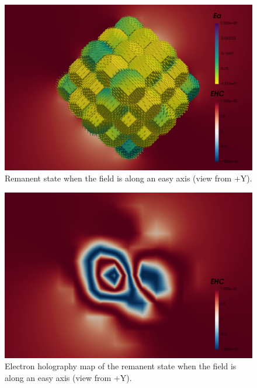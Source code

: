 \begin{figure}
\centering
\includegraphics[width=\textwidth]{research-4/figs/fram_i21_f0_-y.png}
\caption[Remanent state when the field is along an easy axis (view from +Y)]{Remanent state when the field is along an easy axis (view from +Y).}
\label{FIG_17}
\end{figure}

\begin{figure}
\centering
\includegraphics[width=\textwidth]{research-4/figs/fram_i21_f0_-y_EHC.png}
\caption[Electron holography map of the remanent state when the field is along an easy axis (view from +Y)]{Electron holography map of the remanent state when the field is along an easy axis (view from +Y).}
\label{FIG_18}
\end{figure}


